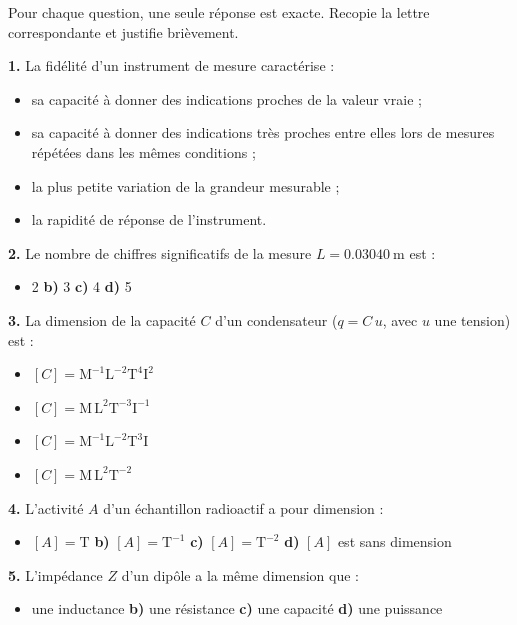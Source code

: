\documentclass[11pt]{article}
\newcommand{\cle}[1]{{\popxbold\color{popdark}#1}}
\begin{document}
\begin{exercice}
Pour chaque question, une seule réponse est exacte. Recopie la lettre correspondante et justifie brièvement.

\textbf{1.} La \cle{fidélité} d'un instrument de mesure caractérise :
\begin{itemize}
    \item[\textbf{a)}] sa capacité à donner des indications proches de la valeur vraie ;
    \item[\textbf{b)}] sa capacité à donner des indications très proches entre elles lors de mesures répétées dans les mêmes conditions ;
    \item[\textbf{c)}] la plus petite variation de la grandeur mesurable ;
    \item[\textbf{d)}] la rapidité de réponse de l'instrument.
\end{itemize}

\textbf{2.} Le nombre de chiffres significatifs de la mesure $L = \num{0,03040}~\text{m}$ est :
\begin{itemize}
    \item[\textbf{a)}] 2 \quad \textbf{b)} 3 \quad \textbf{c)} 4 \quad \textbf{d)} 5
\end{itemize}

\textbf{3.} La dimension de la \cle{capacité} $C$ d'un condensateur ($q = C\,u$, avec $u$ une tension) est :
\begin{itemize}
    \item[\textbf{a)}] $[C] = \text{M}^{-1}\text{L}^{-2}\text{T}^{4}\text{I}^{2}$
    \item[\textbf{b)}] $[C] = \text{M}\,\text{L}^{2}\text{T}^{-3}\text{I}^{-1}$
    \item[\textbf{c)}] $[C] = \text{M}^{-1}\text{L}^{-2}\text{T}^{3}\text{I}$
    \item[\textbf{d)}] $[C] = \text{M}\,\text{L}^{2}\text{T}^{-2}$
\end{itemize}

\textbf{4.} L'\cle{activité} $A$ d'un échantillon radioactif a pour dimension :
\begin{itemize}
    \item[\textbf{a)}] $[A] = \text{T}$ \quad \textbf{b)} $[A] = \text{T}^{-1}$ \quad \textbf{c)} $[A] = \text{T}^{-2}$ \quad \textbf{d)} $[A]$ est sans dimension
\end{itemize}

\textbf{5.} L'\cle{impédance} $Z$ d'un dipôle a la même dimension que :
\begin{itemize}
    \item[\textbf{a)}] une inductance \quad \textbf{b)} une résistance \quad \textbf{c)} une capacité \quad \textbf{d)} une puissance
\end{itemize}
\end{exercice}
\end{document}
